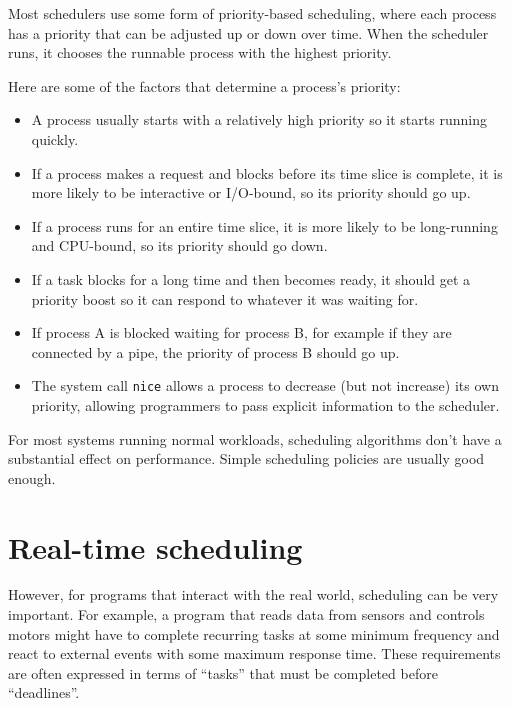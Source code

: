 \documentclass[12pt]{book}
\begin{document}
{\begin{itemize}
\end{itemize}

Most schedulers use some form of priority-based scheduling,
where each process has a priority that can be adjusted up or down
over time.  When the scheduler runs, it chooses the runnable process
with the highest priority.

Here are some of the factors that determine a process's priority:

\begin{itemize}

\item A process usually starts with a relatively high priority so it
  starts running quickly.

\item If a process makes a request and blocks before its time slice is
  complete, it is more likely to be interactive or I/O-bound, so its
  priority should go up.

\item If a process runs for an entire time slice, it is more likely to
  be long-running and CPU-bound, so its priority should go down.

\item If a task blocks for a long time and then becomes ready, it
  should get a priority boost so it can respond to whatever it was
  waiting for.

\item If process A is blocked waiting for process B, for example if
  they are connected by a pipe, the priority of process B should go
  up.

\item The system call {\tt nice} allows a process to decrease (but not
  increase) its own priority, allowing programmers to pass explicit
  information to the scheduler.

\end{itemize}

For most systems running normal workloads, scheduling algorithms
don't have a substantial effect on performance.  Simple scheduling
policies are usually good enough.


\section{Real-time scheduling}

However, for programs that interact with the real world, scheduling
can be very important.  For example, a program that reads data from
sensors and controls motors might have to complete recurring tasks at
some minimum frequency and react to external events with some maximum
response time.  These requirements are often expressed in terms of
``tasks'' that must be completed before ``deadlines''.

}
\end{document}

